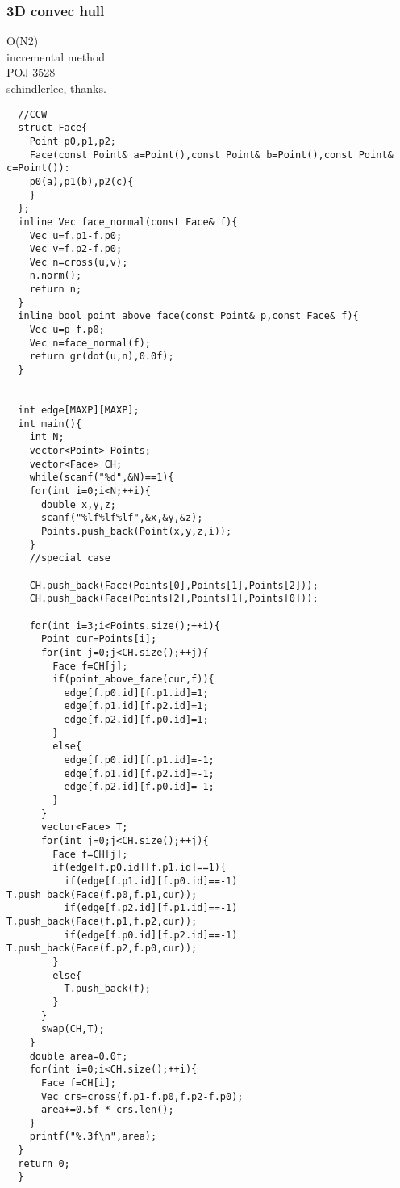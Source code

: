 \documentclass[a4paper]{article}
\begin{document}
\subsubsection{3D convec hull}
O(N2) \\
incremental method \\
POJ 3528 \\
schindlerlee, thanks.
\begin{lstlisting}
  //CCW
  struct Face{
    Point p0,p1,p2;
    Face(const Point& a=Point(),const Point& b=Point(),const Point& c=Point()):
    p0(a),p1(b),p2(c){
    }
  };
  inline Vec face_normal(const Face& f){
    Vec u=f.p1-f.p0;
    Vec v=f.p2-f.p0;
    Vec n=cross(u,v);
    n.norm();
    return n;
  }
  inline bool point_above_face(const Point& p,const Face& f){
    Vec u=p-f.p0;
    Vec n=face_normal(f);
    return gr(dot(u,n),0.0f);
  }


  int edge[MAXP][MAXP];
  int main(){
    int N;
    vector<Point> Points;
    vector<Face> CH;
    while(scanf("%d",&N)==1){
    for(int i=0;i<N;++i){
      double x,y,z;
      scanf("%lf%lf%lf",&x,&y,&z);
      Points.push_back(Point(x,y,z,i));
    }
    //special case

    CH.push_back(Face(Points[0],Points[1],Points[2]));
    CH.push_back(Face(Points[2],Points[1],Points[0]));
    
    for(int i=3;i<Points.size();++i){
      Point cur=Points[i];
      for(int j=0;j<CH.size();++j){
        Face f=CH[j];
        if(point_above_face(cur,f)){
          edge[f.p0.id][f.p1.id]=1;
          edge[f.p1.id][f.p2.id]=1;
          edge[f.p2.id][f.p0.id]=1;
        }
        else{
          edge[f.p0.id][f.p1.id]=-1;
          edge[f.p1.id][f.p2.id]=-1;
          edge[f.p2.id][f.p0.id]=-1;
        }
      }
      vector<Face> T;
      for(int j=0;j<CH.size();++j){
        Face f=CH[j];
        if(edge[f.p0.id][f.p1.id]==1){
          if(edge[f.p1.id][f.p0.id]==-1) T.push_back(Face(f.p0,f.p1,cur));
          if(edge[f.p2.id][f.p1.id]==-1) T.push_back(Face(f.p1,f.p2,cur));
          if(edge[f.p0.id][f.p2.id]==-1) T.push_back(Face(f.p2,f.p0,cur));
        }
        else{
          T.push_back(f);
        }
      }
      swap(CH,T);
    }
    double area=0.0f;
    for(int i=0;i<CH.size();++i){
      Face f=CH[i];
      Vec crs=cross(f.p1-f.p0,f.p2-f.p0);
      area+=0.5f * crs.len();
    }
    printf("%.3f\n",area);
  }
  return 0;
  }
\end{lstlisting}
\end{document}
